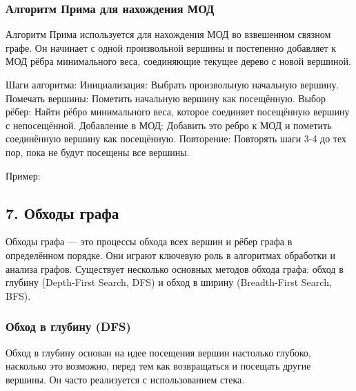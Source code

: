 \documentclass{article}
\begin{document}
\subsubsection*{Алгоритм Прима для нахождения МОД}
Алгоритм Прима используется для нахождения МОД во взвешенном связном графе. Он начинает с одной произвольной вершины и постепенно добавляет к МОД рёбра минимального веса, соединяющие текущее дерево с новой вершиной.

Шаги алгоритма:
Инициализация: Выбрать произвольную начальную вершину.
Помечать вершины: Пометить начальную вершину как посещённую.
Выбор рёбер: Найти рёбро минимального веса, которое соединяет посещённую вершину с непосещённой.
Добавление в МОД: Добавить это ребро к МОД и пометить соединённую вершину как посещённую.
Повторение: Повторять шаги 3-4 до тех пор, пока не будут посещены все вершины.

Пример:
\pagebreak

\subsection*{7. Обходы графа}
Обходы графа — это процессы обхода всех вершин и рёбер графа в определённом порядке. Они играют ключевую роль в алгоритмах обработки и анализа графов. Существует несколько основных методов обхода графа: обход в глубину (Depth-First Search, DFS) и обход в ширину (Breadth-First Search, BFS).

\subsubsection*{Обход в глубину (DFS)}
Обход в глубину основан на идее посещения вершин настолько глубоко, насколько это возможно, перед тем как возвращаться и посещать другие вершины. Он часто реализуется с использованием стека.
\end{document}
